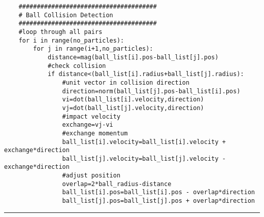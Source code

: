 \documentclass[a4]{article}
\begin{document}
{\begin{verbatim}
    ######################################
    # Ball Collision Detection
    ######################################
    #loop through all pairs
    for i in range(no_particles):
        for j in range(i+1,no_particles):
            distance=mag(ball_list[i].pos-ball_list[j].pos)
            #check collision
            if distance<(ball_list[i].radius+ball_list[j].radius):
                #unit vector in collision direction
                direction=norm(ball_list[j].pos-ball_list[i].pos)
                vi=dot(ball_list[i].velocity,direction)
                vj=dot(ball_list[j].velocity,direction)
                #impact velocity
                exchange=vj-vi
                #exchange momentum
                ball_list[i].velocity=ball_list[i].velocity + exchange*direction
                ball_list[j].velocity=ball_list[j].velocity - exchange*direction
                #adjust position
                overlap=2*ball_radius-distance
                ball_list[i].pos=ball_list[i].pos - overlap*direction
                ball_list[j].pos=ball_list[j].pos + overlap*direction

\end{verbatim}\hrule}

\end{document}
